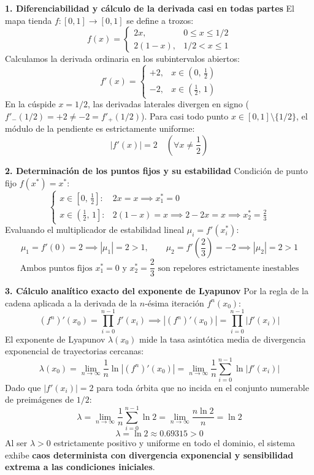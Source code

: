 \documentclass[11pt,a4paper]{article}
\newenvironment{solucion}[1][Solución Detallada]{%
    \vspace{1.5mm}%
    \noindent{\large\textbf{Solución:}}\par\vspace{1.5mm}%
}{%
    \par\vspace{3mm}%
}
\begin{document}
\begin{solucion}

\textbf{\large 1. Diferenciabilidad y cálculo de la derivada casi en todas partes}
El mapa tienda $f: [0, 1] \to [0, 1]$ se define a trozos:
\[
f(x) = \begin{cases} 2x, & 0 \le x \le 1/2 \\ 2(1-x), & 1/2 < x \le 1 \end{cases}
\]
Calculamos la derivada ordinaria en los subintervalos abiertos:
\[
f'(x) = \begin{cases} +2, & x \in \left(0, \, \frac{1}{2}\right) \\ -2, & x \in \left(\frac{1}{2}, \, 1\right) \end{cases}
\]
En la cúspide $x = 1/2$, las derivadas laterales divergen en signo ($f'_-(1/2) = +2 \neq -2 = f'_+(1/2)$). Para casi todo punto $x \in [0, 1] \setminus \{1/2\}$, el módulo de la pendiente es estrictamente uniforme:
\[
\boxed{|f'(x)| = 2 \quad \left(\forall x \neq \frac{1}{2}\right)}
\]

\vspace{3.5mm}

\textbf{\large 2. Determinación de los puntos fijos y su estabilidad}
Condición de punto fijo $f(x^*) = x^*$:
\[
\begin{cases}
x \in \left[0, \, \frac{1}{2}\right]: & 2x = x \implies \boxed{x_1^* = 0} \\
x \in \left(\frac{1}{2}, \, 1\right]: & 2(1-x) = x \implies 2 - 2x = x \implies \boxed{x_2^* = \frac{2}{3}}
\end{cases}
\]
Evaluando el multiplicador de estabilidad lineal $\mu_i = f'(x_i^*)$:
\[
\mu_1 = f'(0) = 2 \implies |\mu_1| = 2 > 1, \qquad \mu_2 = f'\left(\frac{2}{3}\right) = -2 \implies |\mu_2| = 2 > 1
\]
\[
\boxed{\text{Ambos puntos fijos } x_1^* = 0 \text{ y } x_2^* = \frac{2}{3} \text{ son repelores estrictamente inestables}}
\]

\vspace{3.5mm}

\textbf{\large 3. Cálculo analítico exacto del exponente de Lyapunov}
Por la regla de la cadena aplicada a la derivada de la $n$-ésima iteración $f^n(x_0)$:
\[
(f^n)'(x_0) = \prod_{i=0}^{n-1} f'(x_i) \implies \left|(f^n)'(x_0)\right| = \prod_{i=0}^{n-1} |f'(x_i)|
\]
El exponente de Lyapunov $\lambda(x_0)$ mide la tasa asintótica media de divergencia exponencial de trayectorias cercanas:
\[
\lambda(x_0) = \lim_{n \to \infty} \frac{1}{n} \ln \left| (f^n)'(x_0) \right| = \lim_{n \to \infty} \frac{1}{n} \sum_{i=0}^{n-1} \ln |f'(x_i)|
\]
Dado que $|f'(x_i)| = 2$ para toda órbita que no incida en el conjunto numerable de preimágenes de $1/2$:
\[
\lambda = \lim_{n \to \infty} \frac{1}{n} \sum_{i=0}^{n-1} \ln 2 = \lim_{n \to \infty} \frac{n \ln 2}{n} = \ln 2
\]
\[
\boxed{\lambda = \ln 2 \approx 0.69315 > 0}
\]
Al ser $\lambda > 0$ estrictamente positivo y uniforme en todo el dominio, el sistema exhibe \textbf{caos determinista con divergencia exponencial y sensibilidad extrema a las condiciones iniciales}.


\end{solucion}
\end{document}
